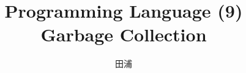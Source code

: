 \documentclass[11pt,dvipdfmx]{beamer}
\title{Programming Language (9) \\
Garbage Collection}
\institute{}
\author{田浦}
\date{}
\newif\ifja
\newif\ifeng
\newcommand{\ao}[1]{{\color{blue}#1}}
\begin{document}
\maketitle

\ifja
\begin{frame}
\frametitle{目次}
\tableofcontents
\end{frame}
\fi
\ifeng
\begin{frame}
\frametitle{Contents}
\tableofcontents
\end{frame}
\fi

\ifja
\section{GCの良し悪しの基準}
\fi
\ifeng
\section{Criteria of evaluating GCs (RC vs. traversing)}
\fi
\ifja
\begin{frame}
\frametitle{GCの良し悪しの基準}
\begin{enumerate}
\item \ao{正確さ:} 
  \begin{itemize}
  \item 回収可能なゴミの範囲が広いか
  \end{itemize}
\item \ao{メモリ割り当てコスト:} 
  \begin{itemize}
  \item メモリ割当をするのに必要な(GCを含めた)仕事
  \end{itemize}
\item \ao{mutatorオーバーヘッド:} 
  \begin{itemize}
  \item GCが機能するためにmutatorに課されるオーバーヘッドが少ないか
  \end{itemize}
\item \ao{停止時間(pause time):} 
  \begin{itemize}
  \item GCが機能するためにmutatorが(一時的に)停止
    しなくてはならない時間が短いか
  \end{itemize}
\end{enumerate}
\end{frame}
\fi
\ifeng
\end{document}
